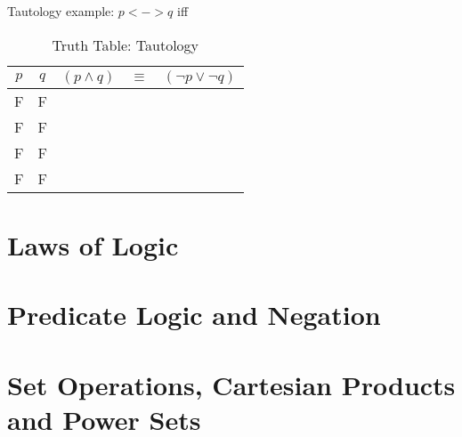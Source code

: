 Tautology example: $p <-> q $ iff 

\begin{table}[!htb]
\label{tab:TruthTableTautology}
\begin{tabularx}{\linewidth}{| c | c | c | c | X |} \hline
  $p$ & $q$ & $(p \land q) $ & $ \equiv $ & $ (\lnot p \lor \lnot q) $
                                                      \\ \hline \hline
   F  &  F  &               &       &                 \\ \hline
   F  &  F  &               &       &                 \\ \hline
   F  &  F  &               &       &                 \\ \hline
   F  &  F  &               &       &                 \\ \hline
\end{tabularx}
\caption{Truth Table: Tautology}
\end{table}


\section{Laws of Logic}
\label{sec:LawsOfLogic}

\section{Predicate Logic and Negation}
\label{sec:PredicateLogicAndNegation}

\section{Set Operations, Cartesian Products and Power Sets}
\label{sec:Sets}

